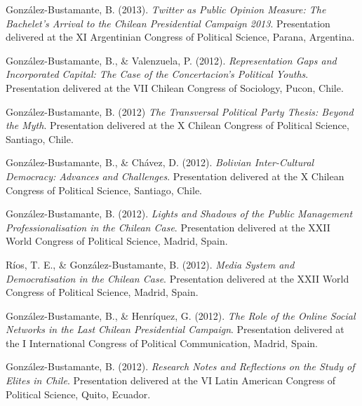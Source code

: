 \begin{publications}
\begin{benumerate}{66}
\item{\small González-Bustamante, B. (2013). {\itshape Twitter as Public Opinion Measure: The Bachelet's Arrival to the Chilean Presidential Campaign 2013}. Presentation delivered at the XI Argentinian Congress of Political Science, Parana, Argentina.}\vspace{1mm}

\item{\small González-Bustamante, B., \& Valenzuela, P. (2012). {\itshape Representation Gaps and Incorporated Capital: The Case of the Concertacion's Political Youths}. Presentation delivered at the VII Chilean Congress of Sociology, Pucon, Chile.}\vspace{1mm}

\item{\small González-Bustamante, B. (2012) {\itshape The Transversal Political Party Thesis: Beyond the Myth}. Presentation delivered at the X Chilean Congress of Political Science, Santiago, Chile.}\vspace{1mm}

\item{\small González-Bustamante, B., \& Chávez, D. (2012). {\itshape Bolivian Inter-Cultural Democracy: Advances and Challenges}. Presentation delivered at the X Chilean Congress of Political Science, Santiago, Chile.}\vspace{1mm}

\item{\small González-Bustamante, B. (2012). {\itshape Lights and Shadows of the Public Management Professionalisation in the Chilean Case}. Presentation delivered at the XXII World Congress of Political Science, Madrid, Spain.}\vspace{1mm}

\item{\small Ríos, T. E., \& González-Bustamante, B. (2012). {\itshape Media System and Democratisation in the Chilean Case}. Presentation delivered at the XXII World Congress of Political Science, Madrid, Spain.}\vspace{1mm}

\item{\small González-Bustamante, B., \& Henríquez, G. (2012). {\itshape The Role of the Online Social Networks in the Last Chilean Presidential Campaign}. Presentation delivered at the I International Congress of Political Communication, Madrid, Spain.}\vspace{1mm}

\item{\small González-Bustamante, B. (2012). {\itshape Research Notes and Reflections on the Study of Elites in Chile}. Presentation delivered at the VI Latin American Congress of Political Science, Quito, Ecuador.}

\end{benumerate}

\end{publications}

